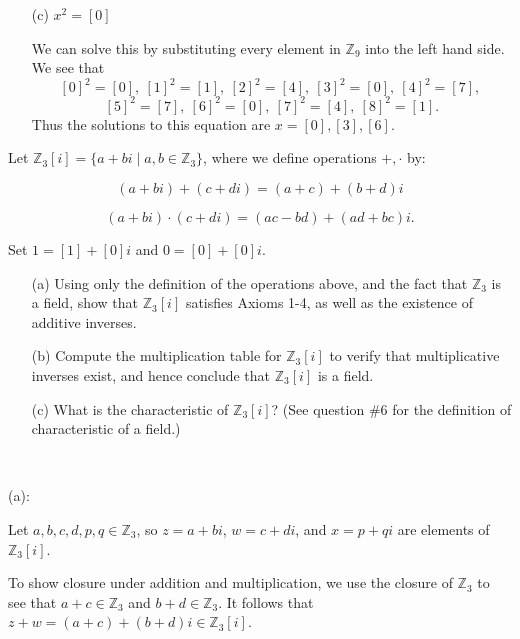 \documentclass{article}
\theoremstyle{plain} %
\numberwithin{thm}{section} %
\theoremstyle{definition}
\begin{document}
\begin{question}{2}
\begin{enumerate}
            \item[(c)] \(x^2 = [0]\)
            
            We can solve this by substituting every element in \(\mathbb{Z}_9\) into the left hand side. We see that
            \[
                [0]^2 = [0],\ [1]^2 = [1],\ [2]^2 = [4],\ [3]^2 = [0],\ [4]^2 = [7],\ 
            \]
            \[
                [5]^2 = [7],\ [6]^2 = [0],\ [7]^2 = [4],\ [8]^2 = [1].
            \]
            Thus the solutions to this equation are \(x = [0], [3], [6]\).
        \end{enumerate}
    \end{question}
    \newpage
    \begin{question}{3}
        Let \( \mathbb{Z}_3[i] = \{ a + bi \mid a, b \in \mathbb{Z}_3 \} \), where we define operations \( +, \cdot \) by:

        \[
        (a + bi) + (c + di) = (a + c) + (b + d)i
        \]

        \[
        (a + bi) \cdot (c + di) = (ac - bd) + (ad + bc)i.
        \]

        Set \( 1 = [1] + [0]i \) and \( 0 = [0] + [0]i \).

        \begin{enumerate}
            \item[(a)] Using only the definition of the operations above, and the fact that \( \mathbb{Z}_3 \) is a field, show that \( \mathbb{Z}_3[i] \) satisfies Axioms 1-4, as well as the existence of additive inverses.
            
            \item[(b)] Compute the multiplication table for \( \mathbb{Z}_3[i] \) to verify that multiplicative inverses exist, and hence conclude that \( \mathbb{Z}_3[i] \) is a field.
            
            \item[(c)] What is the characteristic of \( \mathbb{Z}_3[i] \)? (See question \#6 for the definition of characteristic of a field.)
        \end{enumerate}
        \tcblower
        \ 

        (a):

        Let \(a,b,c,d,p,q \in \mathbb{Z}_3\), so \(z = a + bi\), \(w = c + di\), and \(x = p + qi\) are elements of \(\mathbb{Z}_3[i]\).

        \smallbreak

        To show closure under addition and multiplication, we use the closure of \(\mathbb{Z}_3\) to see that \(a + c \in \mathbb{Z}_3\) and \(b + d \in \mathbb{Z}_3\). It follows that \(z + w = (a + c) + (b + d)i \in \mathbb{Z}_3[i]\).


\end{question}
\end{document}
